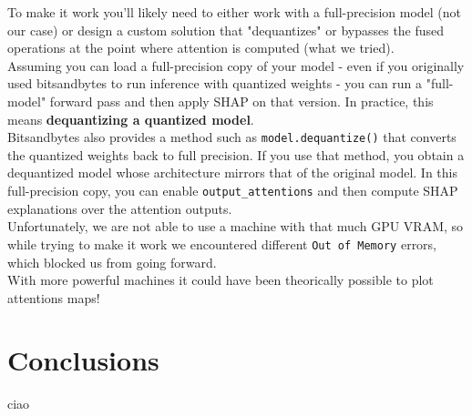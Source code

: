 \documentclass[12pt]{article}
\begin{document}
To make it work you’ll likely need to either work with a full-precision model (not our case) or design a custom solution that "dequantizes" or bypasses the fused operations at the point where attention is computed (what we tried).\vspace{14pt}\\
Assuming you can load a full-precision copy of your model - even if you originally used bitsandbytes to run inference with quantized weights - you can run a "full-model" forward pass and then apply SHAP on that version. In practice, this means \textbf{dequantizing a quantized model}.\\
Bitsandbytes also provides a method such as \texttt{model.dequantize()} that converts the quantized weights back to full precision. If you use that method, you obtain a dequantized model whose architecture mirrors that of the original model. In this full-precision copy, you can enable \texttt{output\_attentions} and then compute SHAP explanations over the attention outputs.\vspace{14pt}\\
Unfortunately, we are not able to use a machine with that much GPU VRAM, so while trying to make it work we encountered different \texttt{Out of Memory} errors, which blocked us from going forward.\vspace{14pt}\\
With more powerful machines it could have been theorically possible to plot attentions maps!

\section{Conclusions}
ciao

\pagebreak


\end{document}
